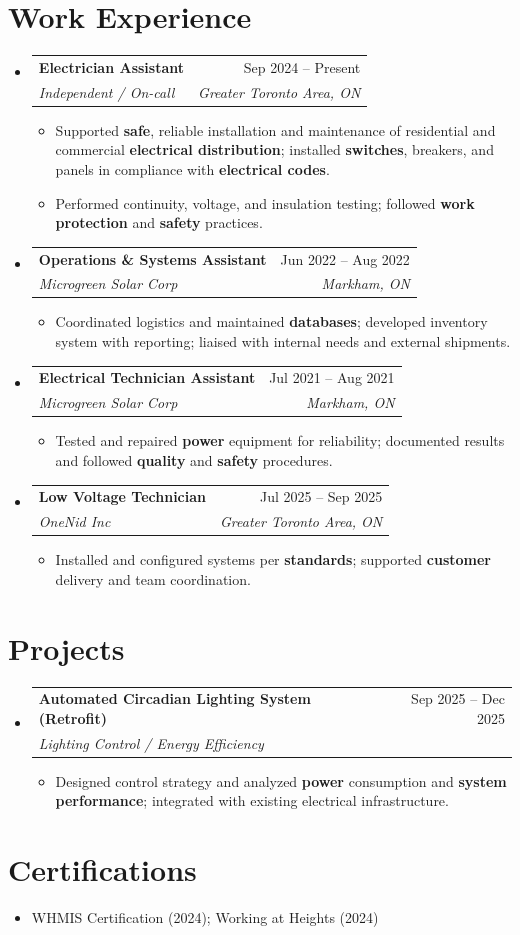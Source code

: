 \documentclass[letterpaper,11pt]{article}
\makeatletter
\newcommand{\resumeItem}[1]{\item\small{{#1 \vspace{-2pt}}}}
\newcommand{\resumeSubheading}[4]{
  \vspace{-2pt}\item
    \begin{tabular*}{0.97\textwidth}[t]{l@{\extracolsep{\fill}}r}
      \textbf{#1} & #2 \\
      \textit{\small #3} & \textit{\small #4} \\
    \end{tabular*}\vspace{-7pt}
}
\newcommand{\resumeSubHeadingListStart}{\begin{itemize}[leftmargin=0.15in, label={}]}
\newcommand{\resumeSubHeadingListEnd}{\end{itemize}}
\newcommand{\resumeItemListStart}{\begin{itemize}}
\newcommand{\resumeItemListEnd}{\end{itemize}\vspace{-5pt}}
\makeatother
\begin{document}
\section{Work Experience}
\resumeSubHeadingListStart

\resumeSubheading
  {Electrician Assistant}{Sep 2024 -- Present}
  {Independent / On-call}{Greater Toronto Area, ON}
\resumeItemListStart
  \resumeItem{Supported \textbf{safe}, reliable installation and maintenance of residential and commercial \textbf{electrical distribution}; installed \textbf{switches}, breakers, and panels in compliance with \textbf{electrical codes}.}
  \resumeItem{Performed continuity, voltage, and insulation testing; followed \textbf{work protection} and \textbf{safety} practices.}
\resumeItemListEnd

\resumeSubheading
  {Operations \& Systems Assistant}{Jun 2022 -- Aug 2022}
  {Microgreen Solar Corp}{Markham, ON}
\resumeItemListStart
  \resumeItem{Coordinated logistics and maintained \textbf{databases}; developed inventory system with reporting; liaised with internal needs and external shipments.}
\resumeItemListEnd

\resumeSubheading
  {Electrical Technician Assistant}{Jul 2021 -- Aug 2021}
  {Microgreen Solar Corp}{Markham, ON}
\resumeItemListStart
  \resumeItem{Tested and repaired \textbf{power} equipment for reliability; documented results and followed \textbf{quality} and \textbf{safety} procedures.}
\resumeItemListEnd

\resumeSubheading
  {Low Voltage Technician}{Jul 2025 -- Sep 2025}
  {OneNid Inc}{Greater Toronto Area, ON}
\resumeItemListStart
  \resumeItem{Installed and configured systems per \textbf{standards}; supported \textbf{customer} delivery and team coordination.}
\resumeItemListEnd

\resumeSubHeadingListEnd

\section{Projects}
\resumeSubHeadingListStart
\resumeSubheading
  {Automated Circadian Lighting System (Retrofit)}{Sep 2025 -- Dec 2025}
  {Lighting Control / Energy Efficiency}{ }
\resumeItemListStart
  \resumeItem{Designed control strategy and analyzed \textbf{power} consumption and \textbf{system performance}; integrated with existing electrical infrastructure.}
\resumeItemListEnd
\resumeSubHeadingListEnd

\section{Certifications}
\begin{itemize}[leftmargin=0.15in]
  \item WHMIS Certification (2024); Working at Heights (2024)
\end{itemize}
\end{document}
